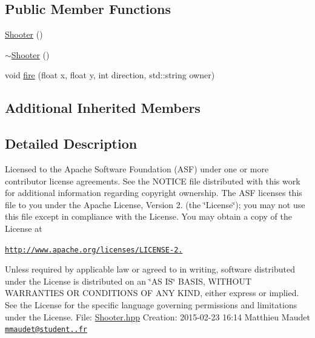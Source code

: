 \subsection*{Public Member Functions}
\begin{DoxyCompactItemize}
\item 
\hyperlink{class_shooter_acc429ebafcc36bb592c752097c22657f}{Shooter} ()
\item 
\hyperlink{class_shooter_a721a5786ef137f1b27f634988cc12f7e}{$\sim$\-Shooter} ()
\item 
void \hyperlink{class_shooter_adc34229494950169d09804f1d524ac7d}{fire} (float x, float y, int direction, std\-::string owner)
\end{DoxyCompactItemize}
\subsection*{Additional Inherited Members}


\subsection{Detailed Description}
Licensed to the Apache Software Foundation (A\-S\-F) under one or more contributor license agreements. See the N\-O\-T\-I\-C\-E file distributed with this work for additional information regarding copyright ownership. The A\-S\-F licenses this file to you under the Apache License, Version 2. (the \char`\"{}\-License\char`\"{}); you may not use this file except in compliance with the License. You may obtain a copy of the License at

\href{http://www.apache.org/licenses/LICENSE-2.0}{\tt http\-://www.\-apache.\-org/licenses/\-L\-I\-C\-E\-N\-S\-E-\/2.}

Unless required by applicable law or agreed to in writing, software distributed under the License is distributed on an \char`\"{}\-A\-S I\-S\char`\"{} B\-A\-S\-I\-S, W\-I\-T\-H\-O\-U\-T W\-A\-R\-R\-A\-N\-T\-I\-E\-S O\-R C\-O\-N\-D\-I\-T\-I\-O\-N\-S O\-F A\-N\-Y K\-I\-N\-D, either express or implied. See the License for the specific language governing permissions and limitations under the License. File\-: \hyperlink{_shooter_8hpp}{Shooter.\-hpp} Creation\-: 2015-\/02-\/23 16\-:14 Matthieu Maudet \href{mailto:mmaudet@student.42.fr}{\tt mmaudet@student..\-fr} 

